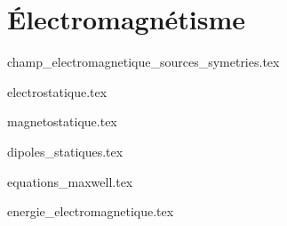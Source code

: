 \part{Électromagnétisme}

{champ_electromagnetique_sources_symetries.tex}

{electrostatique.tex}

{magnetostatique.tex}

{dipoles_statiques.tex}

{equations_maxwell.tex}

{energie_electromagnetique.tex}